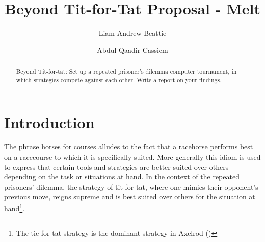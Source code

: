 \documentclass[11pt,preprint]{elsarticle}
\numberwithin{equation}{section}
\numberwithin{figure}{section}
\numberwithin{table}{section}
\let\rmarkdownfootnote\footnote%
\def\footnote{\protect\rmarkdownfootnote}
\begin{document}
\begin{frontmatter}  %

\title{Beyond Tit-for-Tat Proposal - Melt}





\author[Add1]{Liam Andrew Beattie}

\author[Add1]{Abdul Qaadir Cassiem}




\address[Add1]{Microeconomics 871, Stellenbosch University, South
Africa}


\begin{abstract}
\small{
Beyond Tit-for-tat: Set up a repeated prisoner's dilemma computer
tournament, in which strategies compete against each other. Write a
report on your findings.
}
\end{abstract}

\vspace{1cm}





\vspace{0.5cm}

\end{frontmatter}

\setcounter{footnote}{0}



\pagestyle{fancy}
\chead{}
\rhead{}
\lfoot{}
\lhead{}
\cfoot{}


\headsep 35pt %




\section{\texorpdfstring{Introduction
\label{Introduction}}{Introduction }}\label{introduction}

The phrase horses for courses alludes to the fact that a racehorse
performs best on a racecourse to which it is specifically suited. More
generally this idiom is used to express that certain tools and
strategies are better suited over others depending on the task or
situations at hand. In the context of the repeated prisoners' dilemma,
the strategy of tit-for-tat, where one mimics their opponent's previous
move, reigns supreme and is best suited over others for the situation at
hand\footnote{The tic-for-tat strategy is the dominant strategy in
  Axelrod ()}.
\end{document}
